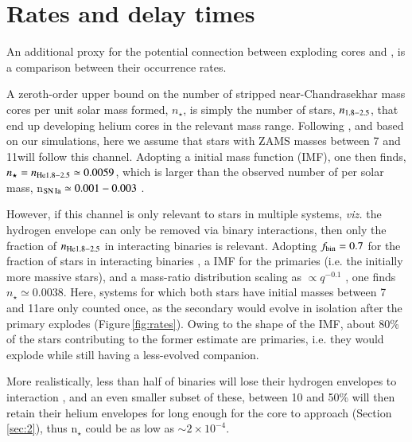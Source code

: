 \documentclass{aa}
\begin{document}
\section{Rates and delay times}\label{sec:4}
An additional  proxy for the potential connection between exploding \one cores and \ia, is a comparison between their  occurrence rates. 

A zeroth-order upper bound on the number of stripped near-Chandrasekhar mass \one cores per unit solar mass formed, $n_\star$, is 
simply the number of stars, $n_{\rm{1.8-2.5}}$, that end up developing  helium cores in the relevant mass range. Following 
\cite{Farmer:2015afs}, and based on our simulations, here we assume that stars with ZAMS masses between 7 and 11\msun will follow 
this channel. Adopting a \cite{Chabrier:2004vw} initial mass function (IMF), one then finds,  $n_\star=n_{\rm{He}1.8-2.5}\simeq 0.0059$, which is larger than the observed number of \ias per solar mass, n$_{\rm SN\,Ia}\simeq 0.001-0.003$ \citep[e.g][]{claeys2014a,Maoz:2013hna}.

However, if this channel is only relevant to stars in multiple systems, {\it viz.} the hydrogen envelope can only be removed via binary 
interactions, then only the fraction of $n_{\rm{He}1.8-2.5}$ in interacting binaries is relevant. 
Adopting $f_{\rm bin}=0.7$ for the fraction of stars in interacting binaries \citep{Sana:2012px}, a \cite{Chabrier:2004vw} IMF for the primaries (i.e. the 
initially more massive stars), and a mass-ratio distribution scaling as $\propto q^{-0.1}$ \citep{Sana:2012px}, one finds $n_\star \simeq 0.0038$. Here, systems for which both stars have initial masses between 7 and 11\msun are only counted once, as the secondary would evolve in isolation after the primary explodes (Figure\,\ref{fig:rates}). Owing to the shape of the IMF, about 80\% of the stars contributing to the former estimate are primaries, i.e. they would explode while still having a less-evolved companion.


More realistically, less than half of binaries  will lose their hydrogen envelopes to  interaction \citep{Sana:2012px}, and an 
even smaller subset of these, between 10 and 50\% will then retain their helium envelopes for long enough for the core to approach 
\mch (Section\,\ref{sec:2}), thus n$_\star$ could be as low as $\sim 2\times 10^{-4}$. 
\end{document}
